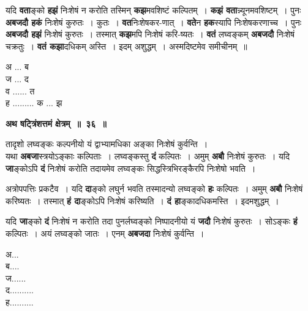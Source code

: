 \documentclass[11pt, openany]{book}
\begin{document}
\begin{flushleft}
\begin{minipage}[t]{0.65\textwidth}
\hspace{4mm} यदि \textbf{वता}ङ्को \textbf{हझं} निःशेषं न करोति तस्मिन् \textbf{कझ}मवशिष्टं कल्पितम्~। \textbf{कझं वता}न्न्यूनमवशिष्टम्~। पुनः \textbf{अबजदौ हकं} निःशेषं कुरुतः~। कुतः~। \textbf{वत}निःशेषकर-णात्~। \textbf{वते}न \textbf{हक}स्यापि निःशेषकरणाच्च~। पुनः \textbf{अबजदौ हझं} निःशेषं कुरुतः~। तस्मात् \textbf{कझ}मपि निःशेषं करि-ष्यतः~। \textbf{वतं} लघ्वङ्कम् \textbf{अबजदौ} निःशेषं चक्रतुः~। \textbf{वतं कझा}दधिकम् अस्ति~। इदम् अशुद्धम्~। अस्मदिष्टमेव समीचीनम्~॥
\end{minipage} 
\hfill
\begin{minipage}[t]{0.25\textwidth}
\vspace{1mm}
अ ... ब\\
ज ... द \\
व ...... त \\
ह ......... क ... झ
\end{minipage}
\end{flushleft}
\vspace{-2mm}

\begin{center}
\textbf{\large अथ षट्त्रिंशत्तमं क्षेत्रम्~॥~३६~॥}
\end{center}

{\ab तादृशो लघ्वङ्कः कल्पनीयो यं द्वाभ्यामधिका अङ्का निःशेषं कुर्वन्ति~। }\\

 यथा \textbf{अबजा}स्त्रयोऽङ्काः कल्पिताः~। लघ्वङ्कस्तु \textbf{दं} कल्पितः~। अमुम् \textbf{अबौ} निःशेषं कुरुतः~। यदि \textbf{जा}ङ्कोऽपि \textbf{दं} निःशेषं करोति तदायमेव लघ्वङ्कः सिद्धस्त्रिभिरङ्कैरपि निःशेषो भवति~। 
 
\begin{flushleft}
\begin{minipage}[t]{0.75\textwidth}
\hspace{4mm} अत्रोपपत्तिः प्रकटैव~। यदि \textbf{दा}ङ्को लघुर्न भवति तस्मादन्यो लघ्वङ्को \textbf{हः} कल्पितः~। अमुम् \textbf{अबौ} निःशेषं करिष्यतः~। तस्मात् \textbf{हं दा}ङ्कोऽपि निःशेषं करिष्यति~। \textbf{दं हा}ङ्कादधिकमस्ति~। इदमशुद्धम्~। \\
\vspace{-2mm}

\hspace{4mm} यदि \textbf{जा}ङ्को \textbf{दं} निःशेषं न करोति तदा पुनर्लघ्वङ्को निष्पादनीयो यं \textbf{जदौ} निःशेषं कुरुतः~। सोऽङ्कः \textbf{हं} कल्पितः~। अयं लघ्वङ्को जातः~।  एनम् \textbf{अबजदा} निःशेषं कुर्वन्ति~।
\end{minipage} 
\hfill
\begin{minipage}[t]{0.15\textwidth}
अ... \\
ब.... \\
ज...... \\
द..........\\
ह..........
\end{minipage}
\end{flushleft}
\end{document}
